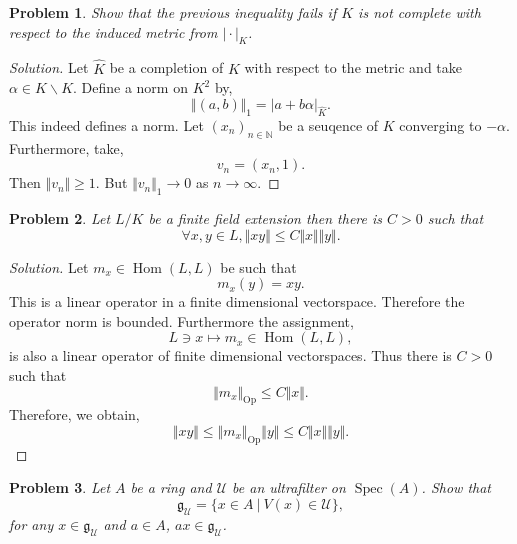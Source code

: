 \documentclass[8pt]{article}
\numberwithin{equation}{section}
\newenvironment{solution}{\begin{proof}[Solution]}{\end{proof}}
\newtheorem{problem}{Problem}[section]
\DeclareMathOperator{\Hom}{Hom}
\DeclareMathOperator{\Spec}{Spec}
\newcommand{\norm}[1]{\Vert #1 \Vert}
\newcommand{\N}[0]{\mathbb{N}}
\newcommand{\sep}[0]{\:|\:}
\newcommand{\ab}[1]{\vert #1 \vert}
\begin{document}
\begin{problem}
  Show that the previous inequality fails if $K$ is not complete with respect to the induced metric from $\ab{\cdot}_K$.
\end{problem}
\begin{solution}
  Let $\widehat{K}$ be a completion of $K$ with respect to the metric and take $\alpha\in \widehat{K}\backslash K$. 
  Define a norm on $K^2$ by,
  \begin{equation*}
    \norm{(a,b)}_1 = \ab{a+b\alpha}_{\widehat{K}}.
  \end{equation*}
  This indeed defines a norm. Let $(x_n)_{n\in\N}$ be a seuqence of $K$ converging to $-\alpha$. Furthermore, take,
  \begin{equation*}
    v_n = (x_n,1).
  \end{equation*} 
  Then $\norm{v_n}\geq 1$. But $\norm{v_n}_1\to0$ as $n\to\infty$. 
\end{solution}
\begin{problem}
  Let $L/K$ be a finite field extension then there is $C>0$ such that
  \begin{equation*}
    \forall x,y\in L, \norm{xy}\leq C\norm{x}\norm{y}.
  \end{equation*}
\end{problem}
\begin{solution}
  Let $m_x\in\Hom(L,L)$ be such that 
  \begin{equation*}
    m_x(y) = xy.
  \end{equation*}
  This is a linear operator in a finite dimensional vectorspace. Therefore the operator norm is bounded. Furthermore the assignment,
  \begin{equation*}
    L\ni x\mapsto m_x\in\Hom(L,L),
  \end{equation*}
  is also a linear operator of finite dimensional vectorspaces. Thus there is $C>0$ such that 
  \begin{equation*}
    \norm{m_x}_{\mathrm{Op}}\leq C\norm{x}.
  \end{equation*}
  Therefore, we obtain,
  \begin{equation*}
    \norm{xy}\leq \norm{m_x}_\mathrm{Op}\norm{y}\leq C\norm{x}\norm{y}.
  \end{equation*}
\end{solution}
\begin{problem}
Let $A$ be a ring and $\mathcal{U}$ be an ultrafilter on $\Spec(A)$. Show that 
\begin{equation*}
  \mathfrak{g}_{\mathcal{U}} = \{x\in A\sep V(x)\in\mathcal{U}\},
\end{equation*}
for any $x\in\mathfrak{g}_{\mathcal{U}}$ and $a\in A$, $ax\in\mathfrak{g}_{\mathcal{U}}$.
\end{problem}
\end{document}
